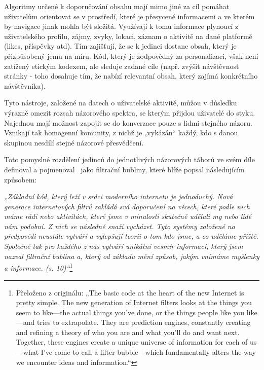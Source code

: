    Algoritmy určené k doporučování obsahu mají mimo jiné za cíl pomáhat uživatelům orientovat se v prostředí, které je přesycené informacemi a ve kterém by navigace jinak mohla být složitá. Využívají k tomu informace plynoucí z uživatelského profilu, zájmy, zvyky, lokaci, záznam o aktivitě na dané platformě (likes, příspěvky atd). Tím zajišťují, že se k jedinci dostane obsah, který je přizpůsobený jemu na míru. Kód, který je zodpovědný za personalizaci, však není zatížený etickým kodexem, ale sleduje zadané cíle (např. zvýšit návštěvnost stránky - toho dosahuje tím, že nabízí relevantní obsah, který zajímá konkrétního návštěvníka).~\citep{Foth} 
    
    Tyto nástroje, založené na datech o uživatelské aktivitě, můžou v důsledku výrazně omezit rozsah názorového spektra, se kterým přijdou uživatelé do styku. Najednou mají možnost zapojit se do konverzace pouze s lidmi stejného názoru. Vznikají tak homogenní komunity, z nichž je „vykázán“ každý, kdo s danou skupinou nesdílí stejné názorové přesvědčení.~\citep{Parsell}
    
    Toto pomyslné rozdělení jedinců do jednotlivých názorových táborů ve svém díle definoval a pojmenoval~\cite{Pariser2012TheFB} jako filtrační bubliny, které blíže popsal následujícím způsobem:
    
    \setlength\parskip{5mm}
    
    \textit{
    „Základní kód, který leží v srdci moderního internetu je jednoduchý. Nová generace internetových filtrů zakládá svá doporučení na věcech, které podle nich máme rádi nebo aktivitách, které jsme v minulosti skutečně udělali my nebo lidé nám podobní. Z nich se následně snaží vycházet. Tyto systémy založené na předpovědi neustále vytváří a vylepšují teorii o tom kdo jsme, a co uděláme příště. Společně tak pro každého z nás vytváří unikátní vesmír informací, který jsem nazval filtrační bublina a, který od základu mění způsob, jakým vnímáme myšlenky a informace. (s. 10)“}\footnote{Přeloženo z originálu: „The basic code at the heart of the new Internet is pretty simple. The new generation of
    Internet filters looks at the things you seem to like—the actual things you’ve done, or the things people like you like—and
    tries to extrapolate. They are prediction engines, constantly creating and refining a theory of who you are and what you’ll do
    and want next. Together, these engines create a unique universe of information for each of us—what I’ve come to call a filter
    bubble—which fundamentally alters the way we encounter ideas and information.“}
    
